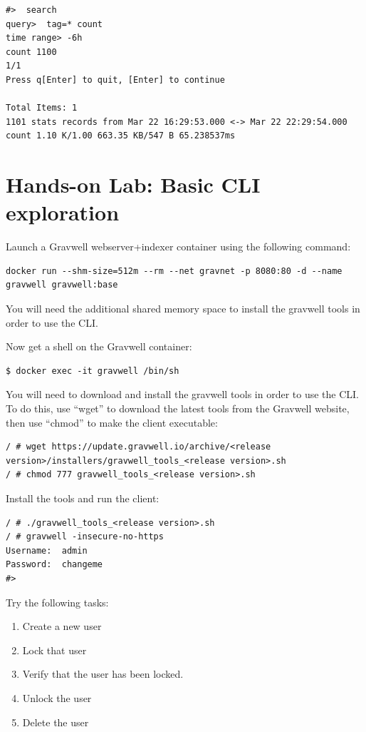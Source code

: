 \begin{Verbatim}[breaklines=true]
#>  search
query>  tag=* count
time range> -6h
count 1100
1/1
Press q[Enter] to quit, [Enter] to continue

Total Items: 1
1101 stats records from Mar 22 16:29:53.000 <-> Mar 22 22:29:54.000
count 1.10 K/1.00 663.35 KB/547 B 65.238537ms
\end{Verbatim}

\section{Hands-on Lab: Basic CLI exploration}

Launch a Gravwell webserver+indexer container using the following command:

\begin{Verbatim}[breaklines=true]
docker run --shm-size=512m --rm --net gravnet -p 8080:80 -d --name gravwell gravwell:base
\end{Verbatim}

You will need the additional shared memory space to install the gravwell tools in order to use the CLI. 

Now get a shell on the Gravwell container:

\begin{Verbatim}[breaklines=true]
$ docker exec -it gravwell /bin/sh
\end{Verbatim}

You will need to download and install the gravwell tools in order to use the CLI. 
To do this, use ``wget'' to download the latest tools from the Gravwell website, then use ``chmod'' to make the client executable:

\begin{Verbatim}[breaklines=true]
/ # wget https://update.gravwell.io/archive/<release version>/installers/gravwell_tools_<release version>.sh 
/ # chmod 777 gravwell_tools_<release version>.sh 
\end{Verbatim}

Install the tools and run the client:

\begin{Verbatim}[breaklines=true]
/ # ./gravwell_tools_<release version>.sh
/ # gravwell -insecure-no-https
Username:  admin
Password:  changeme
#>
\end{Verbatim}

Try the following tasks:

\begin{enumerate}
\item
  {Create a new user}
\item
  {Lock that user}
\item
  {Verify that the user has been locked.}
\item
  {Unlock the user}
\item
  {Delete the user}
\end{enumerate}

